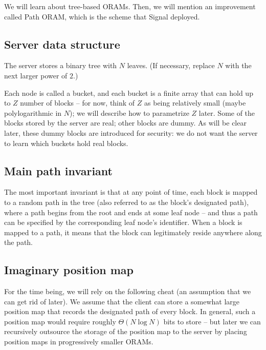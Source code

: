 We will learn about tree-based ORAMs. Then, we will mention an
improvement called Path ORAM,
which is the scheme that Signal deployed.

\subsection{Server data structure}\label{server-data-structure.}

The server stores a binary tree with $N$ leaves. (If necessary,
replace $N$ with the next larger power of $2$.)

Each node is called a \alert{bucket}, and each bucket is a finite array
that can hold up to $Z$ number of blocks -- for now, think of $Z$
as being relatively small (maybe polylogarithmic in $N$); we will
describe how to parametrize $Z$ later. Some of the blocks stored by
the server are \alert{real}; other blocks are \alert{dummy}. As will be
clear later, these dummy blocks are introduced for security: we do not
want the server to learn which buckets hold real blocks.

\subsection{Main path invariant}\label{main-path-invariant.}

The most important invariant is that at any point of time, each block is
mapped to a random path in the tree (also referred to as the block's
designated path), where a path begins from the root and ends at some
leaf node -- and thus a path can be specified by the corresponding leaf
node's identifier. When a block is mapped to a path, it means that the
block can legitimately reside anywhere along the path.

\subsection{Imaginary position map}\label{imaginary-position-map.}

For the time being, we will rely on the following cheat (an assumption
that we can get rid of later). We assume that the client can store a
somewhat large position map that records the designated path of every
block. In general, such a position map would require roughly
$\Theta( N\log N )$ bits to store -- but later we can
recursively outsource the storage of the position map to the server by
placing position maps in progressively smaller ORAMs.

